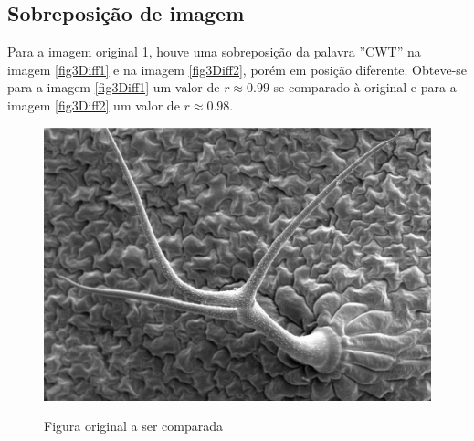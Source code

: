 \documentclass[10pt,a4paper]{article}
\begin{document}
\newpage
\subsection{Sobreposição de imagem}
Para a imagem original \ref{fig3}, houve uma sobreposição da palavra
''CWT'' na imagem \ref{fig3Diff1} e na imagem \ref{fig3Diff2},
porém em posição diferente. Obteve-se para a imagem \ref{fig3Diff1}
um valor de $r\approx 0.99$ se comparado à original e para a imagem \ref{fig3Diff2} 
um valor de $r\approx 0.98$.
\begin{figure}[h!]
\begin{center}
\includegraphics[scale=0.25]{photos/m15_tricome}\label{fig3}
\caption{Figura original a ser comparada}
\end{center}
\end{figure}
\end{document}
